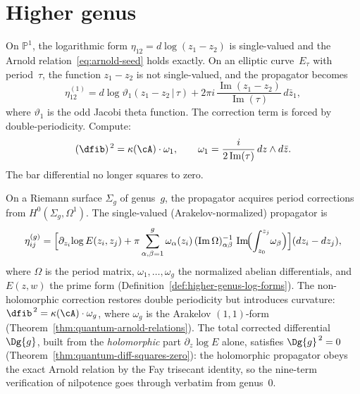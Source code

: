 \chapter{Higher genus}
\label{chap:higher-genus}


On $\mathbb{P}^1$, the logarithmic form
$\eta_{12} = d\log(z_1 - z_2)$ is single-valued and the Arnold
relation~\eqref{eq:arnold-seed} holds exactly.  On an elliptic
curve~$E_\tau$ with period~$\tau$, the function $z_1 - z_2$ is not
single-valued, and the propagator becomes
\begin{equation}\label{eq:elliptic-propagator}
\eta_{12}^{(1)} = d\log \vartheta_1(z_1 - z_2 \,|\, \tau)
+ 2\pi i\, \frac{\operatorname{Im}(z_1 - z_2)}
  {\operatorname{Im}(\tau)}\, d\bar{z}_1,
\end{equation}
where $\vartheta_1$ is the odd Jacobi theta function.  The correction
term is forced by double-periodicity.  Compute:
\begin{equation}\label{eq:curvature-visible}
(\dfib)^{\,2} = \kappa(\cA) \cdot \omega_1, \qquad
\omega_1 = \frac{i}{2\operatorname{Im}(\tau)}\,
dz \wedge d\bar{z}.
\end{equation}
The bar differential no longer squares to zero.

On a Riemann surface $\Sigma_g$ of genus~$g$, the propagator acquires
period corrections from $H^0(\Sigma_g, \Omega^1)$.
The single-valued (Arakelov-normalized) propagator is
\[
\eta_{ij}^{(g)} = \Bigl[\partial_{z_i}\!\log E(z_i, z_j)
  + \pi \sum_{\alpha,\beta=1}^{g}
  \omega_\alpha(z_i)\,(\operatorname{Im}\Omega)^{-1}_{\alpha\beta}\,
  \operatorname{Im}\!\Bigl(\int_{z_0}^{z_j}\!\omega_\beta\Bigr)
\Bigr](dz_i - dz_j),
\]
where $\Omega$ is the period matrix, $\omega_1,\ldots,\omega_g$ the
normalized abelian differentials, and $E(z,w)$ the prime form
(Definition~\ref{def:higher-genus-log-forms}).
The non-holomorphic correction restores double periodicity but
introduces curvature:
$\dfib^{\,2} = \kappa(\cA) \cdot \omega_g$, where $\omega_g$ is the
Arakelov $(1,1)$-form
(Theorem~\ref{thm:quantum-arnold-relations}).
The total corrected differential $\Dg{g}$, built from the
\emph{holomorphic} part $\partial_z\!\log E$ alone, satisfies
$\Dg{g}^{\,2} = 0$
(Theorem~\ref{thm:quantum-diff-squares-zero}):
the holomorphic propagator obeys the exact Arnold relation
by the Fay trisecant identity, so the nine-term verification
of nilpotence goes through verbatim from genus~$0$.

